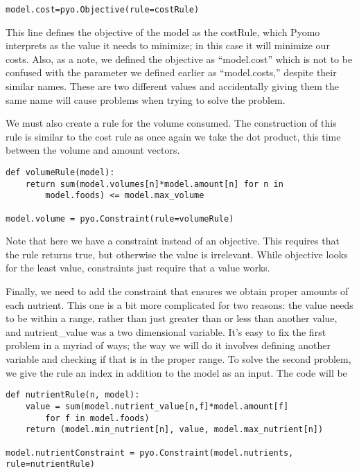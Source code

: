 \documentclass{article}
\begin{document}
\begin{verbatim}model.cost=pyo.Objective(rule=costRule) \end{verbatim}

This line defines the objective of the model as the costRule,  which Pyomo interprets as the value it needs to minimize; in this case it will minimize our costs.  Also, as a note, we defined the objective as ``model.cost'' which is not to be confused with the parameter we defined earlier as ``model.costs,'' despite their similar names.  These are two different values and accidentally giving them the same name will cause problems when trying to solve the problem.

We must also create a rule for the volume consumed.  The construction of this rule is similar to the cost rule as once again we take the dot product, this time between the volume and amount vectors.

\begin{verbatim}def volumeRule(model):
    return sum(model.volumes[n]*model.amount[n] for n in
        model.foods) <= model.max_volume

model.volume = pyo.Constraint(rule=volumeRule)
\end{verbatim}

Note that here we have a constraint instead of an objective.  This requires that the rule returns true, but otherwise the value is irrelevant.  While objective looks for the least value, constraints just require that a value works.

Finally, we need to add the constraint that ensures we obtain proper amounts of each nutrient.  This one is a bit more complicated for two reasons: the value needs to be within a range, rather than just greater than or less than another value, and nutrient\_value was a two dimensional variable.  It's easy to fix the first problem in a myriad of ways; the way we will do it involves defining another variable and checking if that is in the proper range.  To solve the second problem, we give the rule an index in addition to the model as an input.  The code will be

\begin{verbatim}
def nutrientRule(n, model):
    value = sum(model.nutrient_value[n,f]*model.amount[f]
        for f in model.foods)
    return (model.min_nutrient[n], value, model.max_nutrient[n])

model.nutrientConstraint = pyo.Constraint(model.nutrients, rule=nutrientRule)
\end{verbatim}
\end{document}
